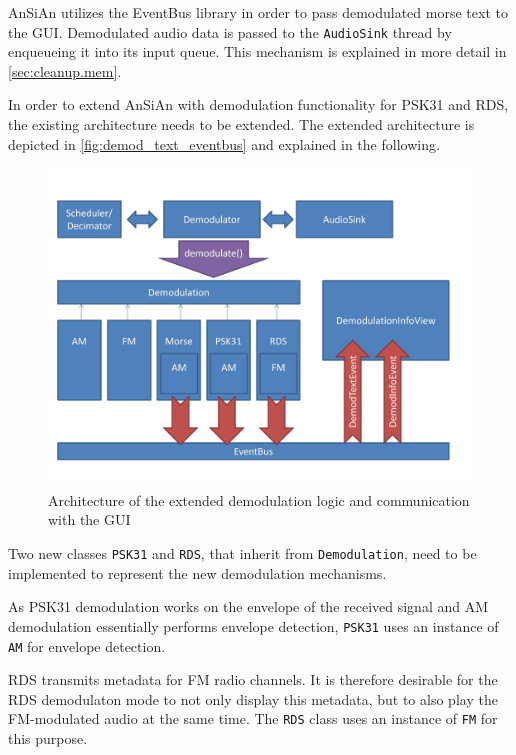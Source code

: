 \ac{AnSiAn} utilizes the EventBus library in order to pass demodulated morse text
to the \ac{GUI}. Demodulated audio data is passed to the
\texttt{AudioSink} thread by enqueueing it into its input queue.
This mechanism is explained in more detail in \autoref{sec:cleanup.mem}.


In order to extend \ac{AnSiAn} with demodulation functionality for \ac{PSK31} and \ac{RDS}, 
the existing architecture needs to be extended. The extended architecture is
depicted in \autoref{fig:demod_text_eventbus} and explained in the following.

 \begin{figure}
	\centering
	\includegraphics[width=1\linewidth]{gfx/demod_text_eventbus.png}
	\caption{Architecture of the extended demodulation logic and communication with the GUI}
	\label{fig:demod_text_eventbus}
\end{figure}

Two new classes \texttt{PSK31} and \texttt{RDS}, that inherit from
\texttt{Demodulation}, need to be implemented to represent the new demodulation 
mechanisms.

As \ac{PSK31} demodulation works on the envelope of the received signal
and \ac{AM} demodulation essentially performs envelope detection, \texttt{PSK31}
uses an instance of \texttt{AM} for envelope detection.

\ac{RDS} transmits metadata for \ac{FM} radio channels. It is therefore desirable for the 
\ac{RDS} demodulaton mode to not only display this metadata, but to also play the 
\ac{FM}-modulated audio at the same time. The \texttt{RDS} class uses an
instance of \texttt{FM} for this purpose.

